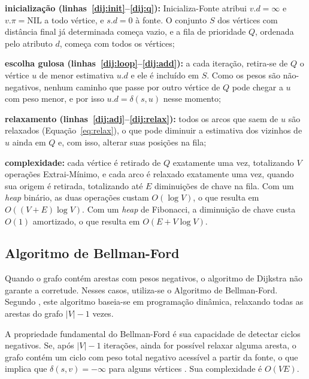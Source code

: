 \begin{alineas}
    \item \textbf{inicialização (linhas~\ref{dij:init}--\ref{dij:q}):} Inicializa-Fonte atribui $v.d = \infty$ e $v.\pi = \text{NIL}$ a todo vértice, e $s.d = 0$ à fonte. O conjunto $S$ dos vértices com distância final já determinada começa vazio, e a fila de prioridade $Q$, ordenada pelo atributo $d$, começa com todos os vértices;
    \item \textbf{escolha gulosa (linhas~\ref{dij:loop}--\ref{dij:add}):} a cada iteração, retira-se de $Q$ o vértice $u$ de menor estimativa $u.d$ e ele é incluído em $S$. Como os pesos são não-negativos, nenhum caminho que passe por outro vértice de $Q$ pode chegar a $u$ com peso menor, e por isso $u.d = \delta(s,u)$ nesse momento;
    \item \textbf{relaxamento (linhas~\ref{dij:adj}--\ref{dij:relax}):} todos os arcos que saem de $u$ são relaxados (Equação~\ref{eq:relax}), o que pode diminuir a estimativa dos vizinhos de $u$ ainda em $Q$ e, com isso, alterar suas posições na fila;
    \item \textbf{complexidade:} cada vértice é retirado de $Q$ exatamente uma vez, totalizando $V$ operações Extrai-Mínimo, e cada arco é relaxado exatamente uma vez, quando sua origem é retirada, totalizando até $E$ diminuições de chave na fila. Com um \textit{heap} binário, as duas operações custam $O(\log V)$, o que resulta em $O((V+E)\log V)$. Com um \textit{heap} de Fibonacci, a diminuição de chave custa $O(1)$ amortizado, o que resulta em $O(E + V\log V)$.
\end{alineas}

\subsection{Algoritmo de Bellman-Ford}

Quando o grafo contém arestas com pesos negativos, o algoritmo de Dijkstra não garante a corretude. Nesses casos, utiliza-se o Algoritmo de Bellman-Ford. Segundo , este algoritmo baseia-se em programação dinâmica, relaxando todas as arestas do grafo $|V|-1$ vezes.

A propriedade fundamental do Bellman-Ford é sua capacidade de detectar ciclos negativos. Se, após $|V|-1$ iterações, ainda for possível relaxar alguma aresta, o grafo contém um ciclo com peso total negativo acessível a partir da fonte, o que implica que $\delta(s,v)=-\infty$ para alguns vértices \cite{kleinberg}. Sua complexidade é $O(VE)$.


